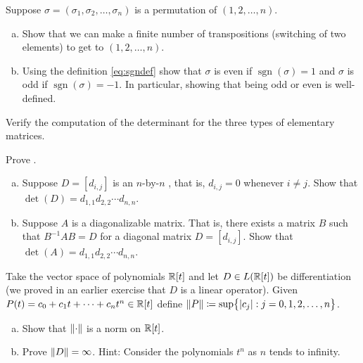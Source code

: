 \begin{exercise}
Suppose $\sigma = (\sigma_1,\sigma_2,\ldots,\sigma_n)$ is a permutation of
$(1,2,\ldots,n)$.
\begin{enumerate}[a)]
\item
Show that we can make a finite number of transpositions (switching of two
elements) to get to $(1,2,\ldots,n)$.
\item
Using the definition \eqref{eq:sgndef}
show that $\sigma$ is even if $\operatorname{sgn}(\sigma) = 1$ and $\sigma$
is odd if $\operatorname{sgn}(\sigma) = -1$.  In particular, showing that
being odd or even is well-defined.
\end{enumerate}
\end{exercise}

\begin{exercise}
Verify the computation of the determinant for the three types of 
elementary matrices.
\end{exercise}

\begin{exercise}
Prove .
\end{exercise}

\begin{exercise}
\leavevmode
\begin{enumerate}[a)]
\item
Suppose $D = [d_{i,j}]$ is an $n$-by-$n$ \emph{}, that is, $d_{i,j} = 0$ whenever $i
\neq j$.  Show that $\det(D) = d_{1,1}d_{2,2} \cdots d_{n,n}$.
\item
Suppose $A$ is a diagonalizable matrix.  That is, there exists a matrix
$B$ such that $B^{-1}AB = D$ for a diagonal matrix $D = [d_{i,j}]$.  Show
that $\det(A) = d_{1,1}d_{2,2} \cdots d_{n,n}$.
\end{enumerate}
\end{exercise}

\begin{exercise}
\pagebreak[1]
Take the vector space of polynomials ${\mathbb{R}}[t]$ and let $D \in L({\mathbb{R}}[t])$ be
differentiation (we proved in an earlier exercise that $D$ is a linear
operator).  Given $P(t) = c_0 + c_1 t + \cdots + c_n
t^n \in {\mathbb{R}}[t]$ define $\lVert {P} \rVert \coloneqq \sup \bigl\{ \lvert {c_j} \rvert : j = 0,1,2,\ldots,n \bigr\}$.
\begin{enumerate}[a)]
\item
Show that $\lVert {\cdot} \rVert$ is a norm on ${\mathbb{R}}[t]$.
\item
Prove $\lVert {D} \rVert = \infty$.  Hint: Consider the polynomials $t^n$ as $n$ tends to infinity.
\end{enumerate}
\end{exercise}

